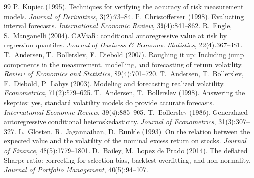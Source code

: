 \documentclass[11pt]{article}
\begin{document}
\begin{thebibliography}{99}
 P.~Kupiec (1995). Techniques for verifying the accuracy of risk measurement models. \emph{Journal of Derivatives}, 3(2):73--84.
 P.~Christoffersen (1998). Evaluating interval forecasts. \emph{International Economic Review}, 39(4):841--862.
 R.~Engle, S.~Manganelli (2004). CAViaR: conditional autoregressive value at risk by regression quantiles. \emph{Journal of Business \& Economic Statistics}, 22(4):367--381.
 T.~Andersen, T.~Bollerslev, F.~Diebold (2007). Roughing it up: Including jump components in the measurement, modelling, and forecasting of return volatility. \emph{Review of Economics and Statistics}, 89(4):701--720.
 T.~Andersen, T.~Bollerslev, F.~Diebold, P.~Labys (2003). Modeling and forecasting realized volatility. \emph{Econometrica}, 71(2):579--625.
 T.~Andersen, T.~Bollerslev (1998). Answering the skeptics: yes, standard volatility models do provide accurate forecasts. \emph{International Economic Review}, 39(4):885--905.
 T.~Bollerslev (1986). Generalized autoregressive conditional heteroskedasticity. \emph{Journal of Econometrics}, 31(3):307--327.
 L.~Glosten, R.~Jagannathan, D.~Runkle (1993). On the relation between the expected value and the volatility of the nominal excess return on stocks. \emph{Journal of Finance}, 48(5):1779--1801.
 D.~Bailey, M.~Lopez de Prado (2014). The deflated Sharpe ratio: correcting for selection bias, backtest overfitting, and non-normality. \emph{Journal of Portfolio Management}, 40(5):94--107.
\end{thebibliography}
\end{document}

